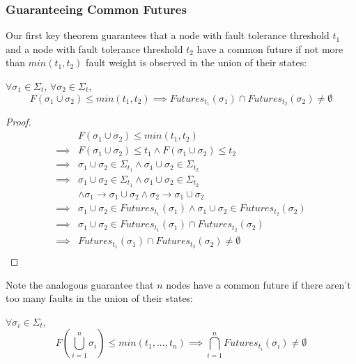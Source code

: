 \subsubsection{Guaranteeing Common Futures}

Our first key theorem guarantees that a node with fault tolerance threshold $t_1$ and a node with fault tolerance threshold $t_2$ have a common future if not more than $min(t_1, t_2)$ fault weight is observed in the union of their states:

\begin{thm}
$\forall \sigma_1 \in \Sigma_t$, $\forall \sigma_2 \in \Sigma_t$,
$$
F(\sigma_1 \cup \sigma_2) \leq min(t_1, t_2) \implies Futures_{t_1}(\sigma_1) \cap Futures_{t_2}(\sigma_2) \neq \emptyset
$$
\end{thm}

\begin{proof}
\begin{align}
         &F(\sigma_1 \cup \sigma_2) \leq min(t_1, t_2) \\
\implies &F(\sigma_1 \cup \sigma_2) \leq t_1 \land F(\sigma_1 \cup \sigma_2) \leq t_2 \\
\implies &\sigma_1 \cup \sigma_2 \in \Sigma_{t_1} \land \sigma_1 \cup \sigma_2 \in \Sigma_{t_2} \\
\implies &\sigma_1 \cup \sigma_2 \in \Sigma_{t_1} \land \sigma_1 \cup \sigma_2 \in \Sigma_{t_2} \\
         &\land \sigma_1 \to \sigma_1 \cup \sigma_2 \land \sigma_2 \to \sigma_1 \cup \sigma_2 \\
\implies &\sigma_1 \cup \sigma_2 \in Futures_{t_1}(\sigma_1) \land \sigma_1 \cup \sigma_2 \in Futures_{t_2}(\sigma_2) \\
\implies &\sigma_1 \cup \sigma_2 \in Futures_{t_1}(\sigma_1) \cap Futures_{t_2}(\sigma_2) \\
\implies &Futures_{t_1}(\sigma_1) \cap Futures_{t_2}(\sigma_2) \neq \emptyset \\
\end{align}
\end{proof}

Note the analogous guarantee that $n$ nodes have a common future if there aren't too many faults in the union of their states:

\begin{thm}
\label{thm:nparty_bft_common_futures}
$\forall \sigma_i \in \Sigma_t$,
$$
F(\bigcup_{i=1}^n \sigma_i) \leq min(t_1, ..., t_n) \implies \bigcap_{i=1}^n Futures_{t_i}(\sigma_i) \neq \emptyset
$$
\end{thm}


